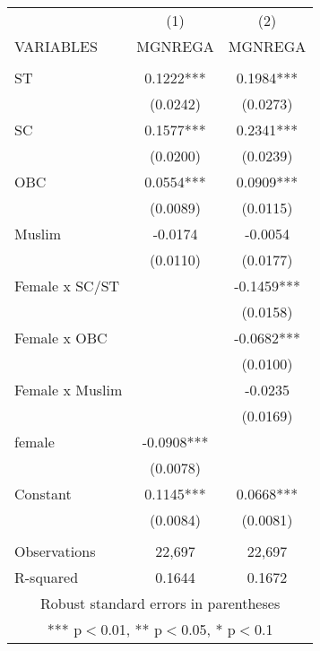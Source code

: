 \documentclass[]{article}
\begin{document}
\begin{tabular}{lcc} \hline
 & (1) & (2) \\
VARIABLES & MGNREGA & MGNREGA \\ \hline
 &  &  \\
ST & 0.1222*** & 0.1984*** \\
 & (0.0242) & (0.0273) \\
SC & 0.1577*** & 0.2341*** \\
 & (0.0200) & (0.0239) \\
OBC & 0.0554*** & 0.0909*** \\
 & (0.0089) & (0.0115) \\
Muslim & -0.0174 & -0.0054 \\
 & (0.0110) & (0.0177) \\
Female x SC/ST &  & -0.1459*** \\
 &  & (0.0158) \\
Female x OBC &  & -0.0682*** \\
 &  & (0.0100) \\
Female x Muslim &  & -0.0235 \\
 &  & (0.0169) \\
female & -0.0908*** &  \\
 & (0.0078) &  \\
Constant & 0.1145*** & 0.0668*** \\
 & (0.0084) & (0.0081) \\
 &  &  \\
Observations & 22,697 & 22,697 \\
 R-squared & 0.1644 & 0.1672 \\ \hline
\multicolumn{3}{c}{ Robust standard errors in parentheses} \\
\multicolumn{3}{c}{ *** p$<$0.01, ** p$<$0.05, * p$<$0.1} \\
\end{tabular}
\end{document}
